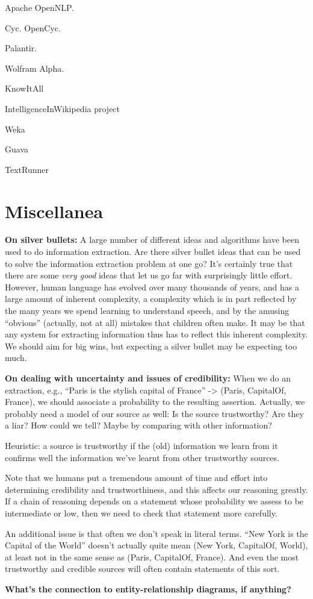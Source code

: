 Apache OpenNLP.

Cyc.  OpenCyc.

Palantir. 

Wolfram Alpha.

KnowItAll

IntelligenceInWikipedia project

Weka

Guava

TextRunner

\section{Miscellanea}

\textbf{On silver bullets:} A large number of different ideas and
algorithms have been used to do information extraction.  Are there
silver bullet ideas that can be used to solve the information
extraction problem at one go?  It's certainly true that there are some
\emph{very good} ideas that let us go far with surprisingly little
effort.  However, human language has evolved over many thousands of
years, and has a large amount of inherent complexity, a complexity
which is in part reflected by the many years we spend learning to
understand speech, and by the amusing ``obvious'' (actually, not at
all) mistakes that children often make.  It may be that any system for
extracting information thus has to reflect this inherent complexity.
We should aim for big wins, but expecting a silver bullet may be
expecting too much.

\textbf{On dealing with uncertainty and issues of credibility:} When
we do an extraction, e.g., ``Paris is the stylish capital of France''
-> (Paris, CapitalOf, France), we should associate a probability to
the resulting assertion.  Actually, we probably need a model of our
source as well: Is the source trustworthy?  Are they a liar?  How
could we tell?  Maybe by comparing with other information?

Heuristic: a source is trustworthy if the (old) information we learn
from it confirms well the information we've learnt from other
trustworthy sources.

Note that we humans put a tremendous amount of time and effort into
determining credibility and trustworthiness, and this affects our
reasoning greatly.  If a chain of reasoning depends on a statement
whose probability we assess to be intermediate or low, then we need to
check that statement more carefully.

An additional issue is that often we don't speak in literal terms.
``New York is the Capital of the World'' doesn't actually quite mean
(New York, CapitalOf, World), at least not in the same sense as
(Paris, CapitalOf, France).  And even the most trustworthy and
credible sources will often contain statements of this sort.

\textbf{What's the connection to entity-relationship diagrams, if
  anything?}

